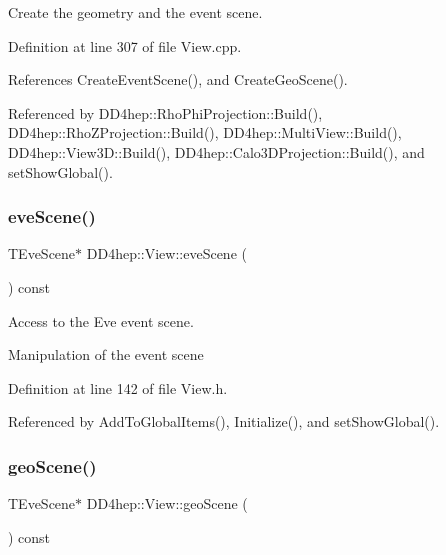 Create the geometry and the event scene. 



Definition at line 307 of file View.\+cpp.



References Create\+Event\+Scene(), and Create\+Geo\+Scene().



Referenced by D\+D4hep\+::\+Rho\+Phi\+Projection\+::\+Build(), D\+D4hep\+::\+Rho\+Z\+Projection\+::\+Build(), D\+D4hep\+::\+Multi\+View\+::\+Build(), D\+D4hep\+::\+View3\+D\+::\+Build(), D\+D4hep\+::\+Calo3\+D\+Projection\+::\+Build(), and set\+Show\+Global().

\hypertarget{class_d_d4hep_1_1_view_aeef39a82e524cc30b1bec56f97071312}{}\label{class_d_d4hep_1_1_view_aeef39a82e524cc30b1bec56f97071312} 
\subsubsection{\texorpdfstring{eve\+Scene()}{eveScene()}}
{\footnotesize\ttfamily T\+Eve\+Scene$\ast$ D\+D4hep\+::\+View\+::eve\+Scene (\begin{DoxyParamCaption}{ }\end{DoxyParamCaption}) const\hspace{0.3cm}{\ttfamily [inline]}}



Access to the Eve event scene. 

Manipulation of the event scene 

Definition at line 142 of file View.\+h.



Referenced by Add\+To\+Global\+Items(), Initialize(), and set\+Show\+Global().

\hypertarget{class_d_d4hep_1_1_view_a660fe2299cb39e61b27eee6899cb1eb1}{}\label{class_d_d4hep_1_1_view_a660fe2299cb39e61b27eee6899cb1eb1} 
\subsubsection{\texorpdfstring{geo\+Scene()}{geoScene()}}
{\footnotesize\ttfamily T\+Eve\+Scene$\ast$ D\+D4hep\+::\+View\+::geo\+Scene (\begin{DoxyParamCaption}{ }\end{DoxyParamCaption}) const\hspace{0.3cm}{\ttfamily [inline]}}



